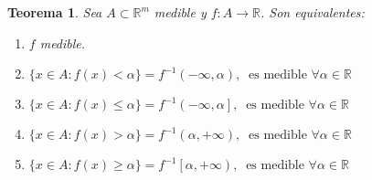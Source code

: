 \documentclass[10pt,a4paper,openright]{book}
\theoremstyle{break}
\newtheorem*{theo}{Teorema}
\begin{document}
\begin{theo}
Sea $A \subset  \mathbb{R}^m$ medible y $f: A \to \mathbb{R}$. Son equivalentes:
\begin{enumerate}
    \item $f$ medible.
    \item $\{x \in A : f\left( x \right) < \alpha\} = f^{-1}\left( -\infty, \alpha \right),\ \mbox{ es medible }\forall \alpha \in \mathbb{R}$
    \item $\{x \in A : f\left( x \right) \le \alpha\} = f^{-1}\left( -\infty, \alpha \right],\ \mbox{ es medible }\forall \alpha \in \mathbb{R}$
    \item $\{x \in A : f\left( x \right) > \alpha\} = f^{-1}\left( \alpha, +\infty \right),\ \mbox{ es medible }\forall \alpha \in \mathbb{R}$
    \item $\{x \in A : f\left( x \right) \ge \alpha\} = f^{-1}\left[ \alpha, +\infty \right),\ \mbox{ es medible }\forall \alpha \in \mathbb{R}$
\end{enumerate}
\end{theo}
\end{document}

